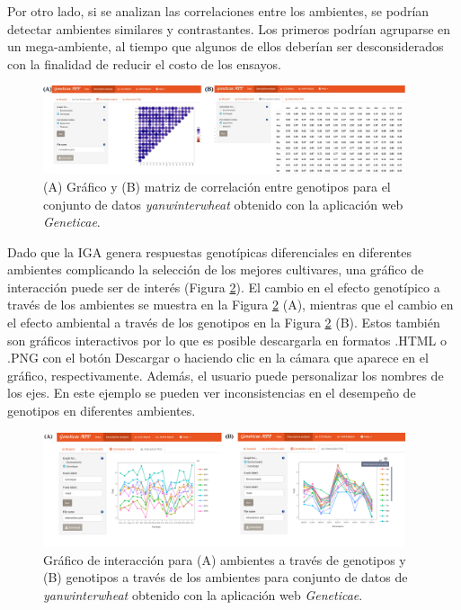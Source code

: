 Por otro lado, si se analizan las correlaciones entre los ambientes, se podrían detectar ambientes similares y contrastantes. Los primeros podrían agruparse en un mega-ambiente, al tiempo que algunos de ellos deberían ser desconsiderados con la finalidad de reducir el costo de los ensayos.


\begin{figure}[h]
	\begin{center}
		\includegraphics[width=0.95\textwidth]{./Graficos/www/correlacion.png}
	\end{center}
	\caption{(A) Gráfico y (B) matriz de correlación entre genotipos para el conjunto de datos \emph{yanwinterwheat} obtenido con la aplicación web \emph{Geneticae}.}
	\label{fig:figdesc2}
\end{figure}


Dado que la IGA genera respuestas genotípicas diferenciales en diferentes ambientes complicando la selección de los mejores cultivares, una gráfico de interacción puede ser de interés (Figura \ref{fig:figdesc3}). El cambio en el efecto genotípico a través de los ambientes se muestra en la Figura \ref{fig:figdesc3} (A), mientras que el cambio en el efecto ambiental a través de los genotipos en la Figura \ref{fig:figdesc3} (B). Estos también son gráficos interactivos por lo que es posible descargarla en formatos .HTML o .PNG con el botón Descargar o haciendo clic en la cámara que aparece en el gráfico, respectivamente. Además, el usuario puede personalizar los nombres de los ejes. En este ejemplo se pueden ver inconsistencias en el desempeño de genotipos en diferentes ambientes. 


\begin{figure}[h]
	\begin{center}
		\includegraphics[width=0.95\textwidth]{./Graficos/www/interaction.png}
	\end{center}
	\caption{Gráfico de interacción para (A) ambientes a través de genotipos y (B) genotipos a través de los ambientes para conjunto de datos de \emph{yanwinterwheat} obtenido con la aplicación web \emph{Geneticae}.}
	\label{fig:figdesc3}
\end{figure}


